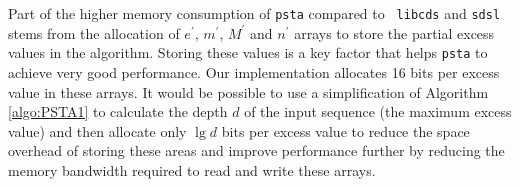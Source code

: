 
Part of the higher memory consumption of {\tt psta} compared to {\tt
  libcds} and {\tt sdsl} stems from the allocation of $e^{\prime}$,
$m^{\prime}$, $M^{\prime}$ and $n^{\prime}$ arrays to store the
partial excess values in the algorithm.  Storing these values is a key
factor that helps {\tt psta} to achieve very good performance.  Our
implementation allocates 16 bits per excess value in these arrays.  It
would be possible to use a simplification of Algorithm
\ref{algo:PSTA1} to calculate the depth $d$ of the input sequence (the
maximum excess value) and then allocate only $\lg d$ bits per excess
value to reduce the space overhead of storing these areas and improve
performance further by reducing the memory bandwidth required to read
and write these arrays.

